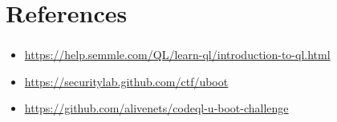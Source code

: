 \documentclass[usenames,dvipsnames]{beamer}
\begin{document}
\section{References}
\begin{frame}
\frametitle{\secname}
\footnotesize
\begin{itemize}[leftmargin=*]
  \item \url{https://help.semmle.com/QL/learn-ql/introduction-to-ql.html}
  \item \url{https://securitylab.github.com/ctf/uboot}
  \item \url{https://github.com/alivenets/codeql-u-boot-challenge}
\end{itemize}
\end{frame}

\end{document}
